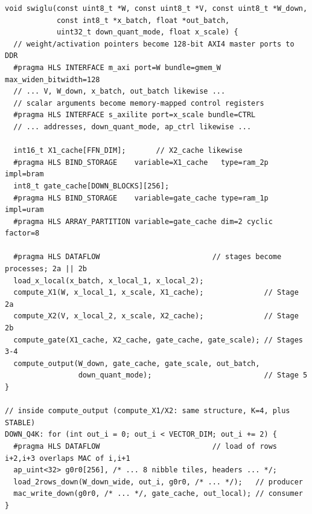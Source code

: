 \begin{lstlisting}[style=hls, float=htb, caption={Condensed top-level HLS function: the external interface and the five-stage dataflow, followed by the loop-level dataflow inside Stage~5. Repeated \texttt{m\_axi} and \texttt{s\_axilite} lines and argument lists are collapsed for clarity.}, label=lst:hls]
void swiglu(const uint8_t *W, const uint8_t *V, const uint8_t *W_down,
            const int8_t *x_batch, float *out_batch,
            uint32_t down_quant_mode, float x_scale) {
  // weight/activation pointers become 128-bit AXI4 master ports to DDR
  #pragma HLS INTERFACE m_axi port=W bundle=gmem_W max_widen_bitwidth=128
  // ... V, W_down, x_batch, out_batch likewise ...
  // scalar arguments become memory-mapped control registers
  #pragma HLS INTERFACE s_axilite port=x_scale bundle=CTRL
  // ... addresses, down_quant_mode, ap_ctrl likewise ...

  int16_t X1_cache[FFN_DIM];       // X2_cache likewise
  #pragma HLS BIND_STORAGE    variable=X1_cache   type=ram_2p impl=bram
  int8_t gate_cache[DOWN_BLOCKS][256];
  #pragma HLS BIND_STORAGE    variable=gate_cache type=ram_1p impl=uram
  #pragma HLS ARRAY_PARTITION variable=gate_cache dim=2 cyclic factor=8

  #pragma HLS DATAFLOW                          // stages become processes; 2a || 2b
  load_x_local(x_batch, x_local_1, x_local_2);
  compute_X1(W, x_local_1, x_scale, X1_cache);              // Stage 2a
  compute_X2(V, x_local_2, x_scale, X2_cache);              // Stage 2b
  compute_gate(X1_cache, X2_cache, gate_cache, gate_scale); // Stages 3-4
  compute_output(W_down, gate_cache, gate_scale, out_batch,
                 down_quant_mode);                          // Stage 5
}

// inside compute_output (compute_X1/X2: same structure, K=4, plus STABLE)
DOWN_Q4K: for (int out_i = 0; out_i < VECTOR_DIM; out_i += 2) {
  #pragma HLS DATAFLOW                          // load of rows i+2,i+3 overlaps MAC of i,i+1
  ap_uint<32> g0r0[256], /* ... 8 nibble tiles, headers ... */;
  load_2rows_down(W_down_wide, out_i, g0r0, /* ... */);   // producer
  mac_write_down(g0r0, /* ... */, gate_cache, out_local); // consumer
}
\end{lstlisting}

